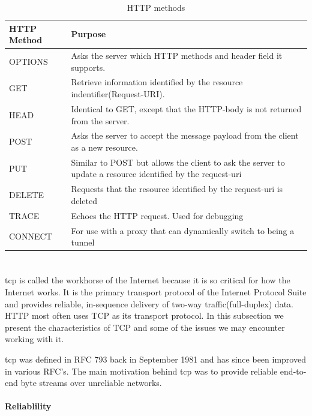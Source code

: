  \begin{table}[h]
 \begin{tabularx}{\textwidth}{| X | X |}
 \hline
   \textbf{HTTP Method} & \textbf{Purpose} \\ \hline
   OPTIONS & Asks the server which HTTP methods and header field it supports. \\ \hline
   GET & Retrieve information identified by the resource indentifier(Request-URI). \\ \hline
   HEAD & Identical to GET, except that the HTTP-body is not returned from the server. \\ \hline
   POST & Asks the server to accept the message payload from the client as a new resource.\\ \hline
   PUT & Similar to POST but allows the client to ask the server to update a resource identified by the request-uri \\ \hline
   DELETE & Requests that the resource identified by the request-uri is deleted \\ \hline
   TRACE & Echoes the HTTP request. Used for debugging \\ \hline
   CONNECT & For use with a proxy that can dynamically switch to being a tunnel\\ \hline
 \end{tabularx}
 \caption{HTTP methods}
 \label{table-http-methods}
 \end{table}

\section{}
\label{tcp}

\gls{tcp} is called the workhorse of the Internet because it is so critical for
how the Internet works. It is the primary transport protocol of the Internet
Protocol Suite\cite{rfc-1122} and provides reliable, in-sequence delivery of
two-way traffic(full-duplex) data. HTTP most often uses TCP as its transport
protocol. In this subsection we present the characteristics of TCP and some of
the issues we may encounter working with it.

\gls{tcp} was defined in RFC 793\cite{rfc-793} back in September 1981 and has
since been improved in various RFC's. The main motivation behind \gls{tcp} was
to provide reliable end-to-end byte streams over unreliable networks.

\paragraph{Reliablility}

